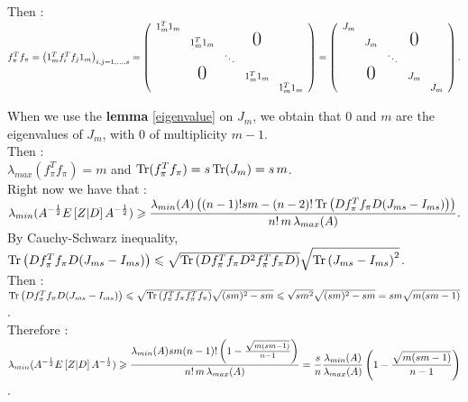     
Then :\\
$f_{\pi}^{T} f_{\pi} = \pare{1_{m}^{T}f_{i}^{T}f_{j}1_{m}}_{i,j=1,\dots,s} =    \left(
    \begin{array}{ccccc}
    1_{m}^{T}1_{m}                                   \\
      & 1_{m}^{T}1_{m}              &   & \text{\huge0}\\
      &               & \ddots               \\
      & \text{\huge0} &   & 1_{m}^{T}1_{m}            \\
      &               &   &   & 1_{m}^{T}1_{m} 
    \end{array}
    \right) = \left(
    \begin{array}{ccccc}
    J_{m}                                 \\
      & J_{m}              &   & \text{\huge0}\\
      &               & \ddots               \\
      & \text{\huge0} &   & J_{m}          \\
      &               &   &   & J_{m}
    \end{array}
    \right).$
    
    When we use the \textbf{lemma} \ref{eigenvalue} on $J_{m}$, we obtain that $0$ and $m$ are the eigenvalues of $J_{m}$, with $0$ of multiplicity $m-1$.\\
Then :\\
$\lambda_{max}(f_{\pi}^{T}f_{\pi}) = m$ and $\operatorname{Tr}(f_{\pi}^{T} f_{\pi}) = s \operatorname{Tr}(J_{m}) = s\, m $.\\

Right now we have that :\\

$\displaystyle \lambda_{min}(A^{-\frac12}E\left[Z|D\right]A^{-\frac12} ) \geqslant \displaystyle  \frac{\lambda_{min}(A) \left( (n-1)!sm - (n-2)! \operatorname{Tr}\left(D f_{\pi}^{T} f_{\pi} D (J_{ms}-I_{ms})\right)    \right)  }{ n! \,m\, \lambda_{max}(A) }. $\\

By Cauchy-Schwarz inequality, $ \operatorname{Tr}\left(D f_{\pi}^{T} f_{\pi} D (J_{ms}-I_{ms})\right) \leqslant  \sqrt{\operatorname{Tr}\left(D f_{\pi}^{T} f_{\pi} D^{2} f_{\pi}^{T} f_{\pi} D \right) }\sqrt{ \operatorname{Tr}\left(J_{ms}-I_{ms}\right)^{2}}$.\\
Then : $ \operatorname{Tr}\left(D f_{\pi}^{T} f_{\pi} D (J_{ms}-I_{ms})\right) \leqslant  \sqrt{\operatorname{Tr}\left( f_{\pi}^{T} f_{\pi} f_{\pi}^{T} f_{\pi} \right) } \sqrt{(sm)^{2}-sm}\leqslant \sqrt{s m^{2}}\sqrt{(sm)^{2}-sm} = sm\sqrt{m(sm-1)}$.\\
Therefore :\\
$\displaystyle \lambda_{min}(A^{-\frac12}E\left[Z|D\right]A^{-\frac12} ) \geqslant  \frac{\lambda_{min}(A) sm(n-1)!\left( 1 -  \frac{\sqrt{m(sm-1)}}{n-1}   \right)  }{ n! \,m\, \lambda_{max}(A) } =\frac{s}{n} \frac{\lambda_{min}(A)}{\lambda_{max}(A)}\left(1-\frac{\sqrt{m(sm-1)}}{n-1}\right) $.\\\\

